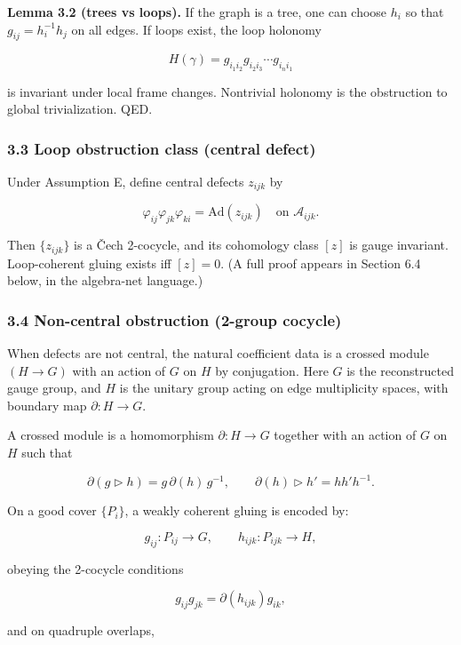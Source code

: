 \documentclass[
]{article}
\begin{document}
\textbf{Lemma 3.2 (trees vs loops).} If the graph is a tree, one can
choose \(h_i\) so that \(g_{ij} = h_i^{-1} h_j\) on all edges. If loops
exist, the loop holonomy

\[
H(\gamma) = g_{i_1 i_2} g_{i_2 i_3} \cdots g_{i_n i_1}
\]

is invariant under local frame changes. Nontrivial holonomy is the
obstruction to global trivialization. QED.

\subsubsection{3.3 Loop obstruction class (central
defect)}\label{loop-obstruction-class-central-defect}

Under Assumption E, define central defects \(z_{ijk}\) by

\[
\varphi_{ij} \varphi_{jk} \varphi_{ki} = \mathrm{Ad}(z_{ijk}) \quad \text{on } \mathcal{A}_{ijk}.
\]

Then \(\{z_{ijk}\}\) is a Čech 2-cocycle, and its cohomology class
\([z]\) is gauge invariant. Loop-coherent gluing exists iff \([z] = 0\).
(A full proof appears in Section 6.4 below, in the algebra-net
language.)

\subsubsection{3.4 Non-central obstruction (2-group
cocycle)}\label{non-central-obstruction-2-group-cocycle}

When defects are not central, the natural coefficient data is a crossed
module \((H \to G)\) with an action of \(G\) on \(H\) by conjugation.
Here \(G\) is the reconstructed gauge group, and \(H\) is the unitary
group acting on edge multiplicity spaces, with boundary map
\(\partial: H \to G\).

A crossed module is a homomorphism \(\partial: H \to G\) together with
an action of \(G\) on \(H\) such that

\[
\partial(g \triangleright h) = g\,\partial(h)\,g^{-1},
\qquad
\partial(h) \triangleright h' = h h' h^{-1}.
\]

On a good cover \(\{P_i\}\), a weakly coherent gluing is encoded by:

\[
g_{ij}: P_{ij} \to G,\qquad h_{ijk}: P_{ijk} \to H,
\]

obeying the 2-cocycle conditions

\[
g_{ij} g_{jk} = \partial(h_{ijk}) g_{ik},
\]

and on quadruple overlaps,
\end{document}
